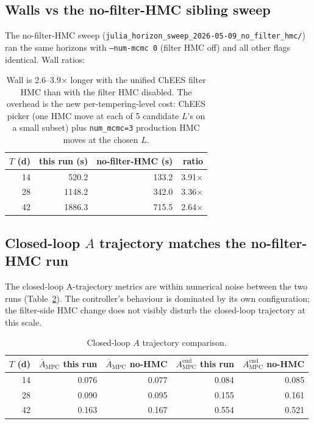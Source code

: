 \documentclass[11pt,a4paper]{article}
\begin{document}
\subsection{Walls vs the no-filter-HMC sibling sweep}

The no-filter-HMC sweep
(\texttt{julia\_horizon\_sweep\_2026-05-09\_no\_filter\_hmc/}) ran
the same horizons with \texttt{--num-mcmc 0} (filter HMC off) and
all other flags identical. Wall ratios:

\begin{table}[ht]
\centering
\small
\begin{tabular}{rrrr}
\toprule
$T$ (d) & this run (s) & no-filter-HMC (s) & ratio \\
\midrule
14 & 520.2  & 133.2  & 3.91$\times$ \\
28 & 1148.2 & 342.0  & 3.36$\times$ \\
42 & 1886.3 & 715.5  & 2.64$\times$ \\
\bottomrule
\end{tabular}
\caption{Wall is 2.6--3.9$\times$ longer with the unified ChEES filter
HMC than with the filter HMC disabled. The overhead is the new
per-tempering-level cost: ChEES picker (one HMC move at each of 5
candidate $L$'s on a small subset) plus \texttt{num\_mcmc=3}
production HMC moves at the chosen $L$.}
\label{tab:wall_ratio}
\end{table}

\subsection{Closed-loop $A$ trajectory matches the no-filter-HMC run}

The closed-loop A-trajectory metrics are within numerical noise
between the two runs (Table~\ref{tab:A_compare}). The controller's
behaviour is dominated by its own configuration; the filter-side
HMC change does not visibly disturb the closed-loop trajectory at
this scale.

\begin{table}[ht]
\centering
\small
\begin{tabular}{rrrrr}
\toprule
$T$ (d) & $\overline{A}_{\mathrm{MPC}}$ this run &
$\overline{A}_{\mathrm{MPC}}$ no-HMC &
$A^{\mathrm{end}}_{\mathrm{MPC}}$ this run &
$A^{\mathrm{end}}_{\mathrm{MPC}}$ no-HMC \\
\midrule
14 & 0.076 & 0.077 & 0.084 & 0.085 \\
28 & 0.090 & 0.095 & 0.155 & 0.161 \\
42 & 0.163 & 0.167 & 0.554 & 0.521 \\
\bottomrule
\end{tabular}
\caption{Closed-loop $A$ trajectory comparison.}
\label{tab:A_compare}
\end{table}
\end{document}
